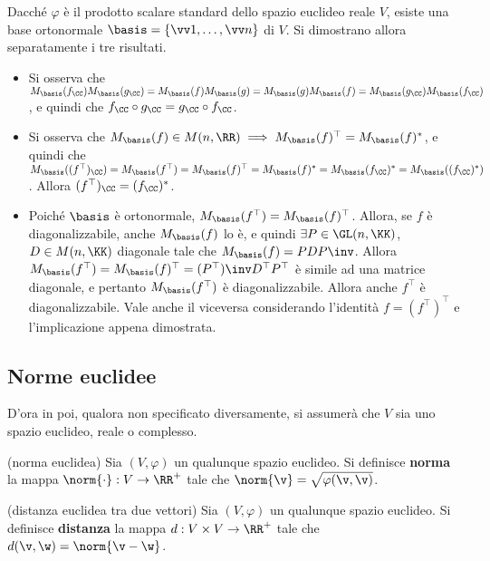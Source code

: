 \begin{solution}
	Dacché $\varphi$ è il prodotto scalare standard dello spazio euclideo reale $V$, esiste una base ortonormale $\basis = \{ \vv 1, \ldots, \vv n\}$ di $V$. Si dimostrano allora separatamente i tre risultati.
	
	\begin{itemize}
		\item Si osserva che $M_\basis(f_\CC) M_\basis(g_\CC) = M_\basis(f) M_\basis(g) =
		M_\basis(g) M_\basis(f) = M_\basis(g_\CC) M_\basis(f_\CC)$, e quindi
		che $f_\CC \circ g_\CC = g_\CC \circ f_\CC$.
		
		\item Si osserva che $M_\basis(f) \in M(n, \RR) \implies M_\basis(f)^\top = M_\basis(f)^*$, e quindi che $M_\basis((f^\top)_\CC) = M_\basis(f^\top) = M_\basis(f)^\top = M_\basis(f)^* = M_\basis(f_\CC)^* = M_\basis((f_\CC)^*)$. Allora
		$(f^\top)_\CC= (f_\CC)^*$.
		
		\item Poiché $\basis$ è ortonormale, $M_\basis(f^\top) = M_\basis(f)^\top$. Allora, se
		$f$ è diagonalizzabile, anche $M_\basis(f)$ lo è, e quindi $\exists P \in \GL(n, \KK)$,
		$D \in M(n, \KK)$ diagonale tale che $M_\basis(f) = P D P\inv$. Allora $M_\basis(f^\top) =
		M_\basis(f)^\top = (P^\top)\inv D^\top P^\top$ è simile ad una matrice diagonale, e
		pertanto $M_\basis(f^\top)$ è diagonalizzabile. Allora anche $f^\top$ è diagonalizzabile.
		Vale anche il viceversa considerando l'identità $f = (f^\top)^\top$ e l'implicazione
		appena dimostrata.
	\end{itemize}
\end{solution}

\subsection{Norme euclidee}

\begin{note}
	D'ora in poi, qualora non specificato diversamente, si assumerà che $V$ sia uno spazio
	euclideo, reale o complesso.
\end{note}

\begin{definition} (norma euclidea)
	Sia $(V, \varphi)$ un qualunque spazio euclideo. Si definisce \textbf{norma} la mappa
	$\norm{\cdot} : V \to \RR^+$ tale che $\norm{\v} = \sqrt{\varphi(\v, \v)}$.
\end{definition}

\begin{definition} (distanza euclidea tra due vettori)
	Sia $(V, \varphi)$ un qualunque spazio euclideo. Si definisce \textbf{distanza} la mappa
	$d : V \times V \to \RR^+$ tale che $d(\v, \w) = \norm{\v - \w}$.
\end{definition}

